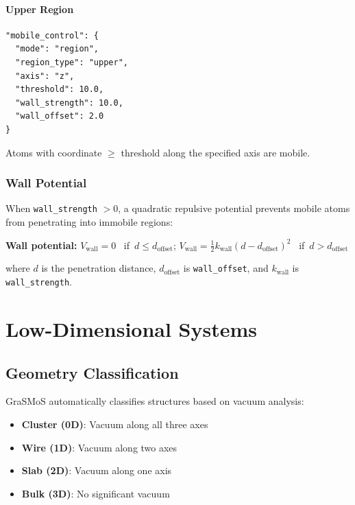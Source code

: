 \documentclass[11pt,a4paper]{article}
\begin{document}
\paragraph{Upper Region}
\begin{lstlisting}[style=jsonStyle]
"mobile_control": {
  "mode": "region",
  "region_type": "upper",
  "axis": "z",
  "threshold": 10.0,
  "wall_strength": 10.0,
  "wall_offset": 2.0
}
\end{lstlisting}
Atoms with coordinate $\ge$ threshold along the specified axis are mobile.

\subsubsection{Wall Potential}
When \texttt{wall\_strength} $> 0$, a quadratic repulsive potential prevents mobile atoms from penetrating into immobile regions:

\begin{center}
\textbf{Wall potential:}\quad
$V_{\text{wall}} = 0$ \ if\ $d \leq d_{\text{offset}}$;\qquad
$V_{\text{wall}} = \tfrac{1}{2}k_{\text{wall}}(d - d_{\text{offset}})^2$ \ if\ $d > d_{\text{offset}}$
\end{center}

where $d$ is the penetration distance, $d_{\text{offset}}$ is \texttt{wall\_offset}, and $k_{\text{wall}}$ is \texttt{wall\_strength}.

\section{Low-Dimensional Systems}

\subsection{Geometry Classification}
GraSMoS automatically classifies structures based on vacuum analysis:
\begin{itemize}
    \item \textbf{Cluster (0D)}: Vacuum along all three axes
    \item \textbf{Wire (1D)}: Vacuum along two axes
    \item \textbf{Slab (2D)}: Vacuum along one axis
    \item \textbf{Bulk (3D)}: No significant vacuum
\end{itemize}
\end{document}
